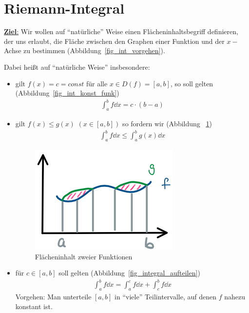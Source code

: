 \section{Riemann-Integral}\label{kap_riemann_integral}
\underline{\textbf{Ziel}:} Wir wollen auf \enquote{natürliche} Weise einen 
Flächeninhaltsbegriff definieren, der uns erlaubt, die Fläche zwischen den Graphen 
einer Funktion und der $x-$Achse zu bestimmen (Abbildung~\ref{fig_int_vorgehen}).
	
	
Dabei heißt auf \enquote{natürliche Weise} insbesondere: 
\begin{itemize}
	\item gilt $f(x) = c = const$ für alle $x \in D (f) = [a,b]$, so soll 
	gelten (Abbildung~\ref{fig_int_konst_funk})
	\begin{align*}
		\int_a^b f \dd{x} = c \cdot ( b - a)
	\end{align*}
	
	
	\item gilt $f(x) \leq g(x)$ $(x \in [a,b])$ so fordern wir (Abbildung~
	\ref{plot_flaeche_zweier_fkt})
	\begin{align*}
		\int_a^b f \dd{x} \leq \int_a^b g(x) \dd{x} 
	\end{align*}
	\begin{figure}[ht]
		\begin{center}
			\includegraphics[scale=0.5]{Skizzen/plot_integral_zwei_fkt}
		\end{center}
		\caption{Flächeninhalt zweier Funktionen}
		\label{plot_flaeche_zweier_fkt}
	\end{figure}
	
	\item für $c \in [a,b]$ soll gelten (Abbildung~\ref{fig_integral_aufteilen})
	\begin{align*}
		\int_a^b f \dd{x} = \int_a^c f \dd{x} + \int_c^b f\dd{x}
	\end{align*}
	Vorgehen: Man unterteile $[a,b]$ in \enquote{viele} Teilintervalle, auf denen 
	$f$ nahezu konstant ist.
	
\end{itemize} 


